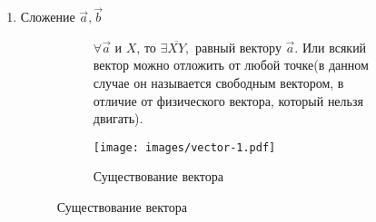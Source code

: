 	\begin{enumerate}
		\item Сложение \(\vec{a}, \vec{b}\) \\
		\begin{figure}[h]
			\begin{subfigure}[b]{0.6\linewidth}
				\begin{note}
					\(\forall \vec{a} \) и $X$, то \(\exists \overline{XY},\) равный вектору \(\vec{a}\). 
					Или всякий вектор можно отложить от любой точке(в данном случае он называется свободным вектором, в отличие от физического вектора, который нельзя двигать).
				\end{note}
			\end{subfigure}
			\begin{subfigure}[b]{0.45\linewidth}
					\centering
					\texttt{[image: images/vector-1.pdf]}
					\caption*{Существование вектора}
					\label{Vector1}
			\end{subfigure}
		\end{figure}
		

\end{enumerate}
